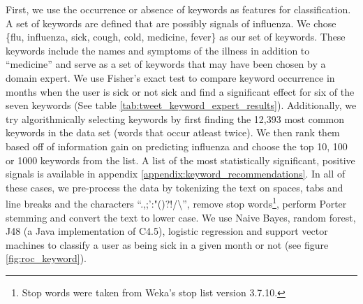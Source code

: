 First, we use the occurrence or absence of keywords as features for classification. A set of keywords are defined that are possibly signals of influenza. We chose \{flu, influenza, sick, cough, cold, medicine, fever\} as our set of keywords. These keywords include the names and symptoms of the illness in addition to ``medicine'' and serve as a set of keywords that may have been chosen by a domain expert. We use Fisher's exact test to compare keyword occurrence in months when the user is sick or not sick and find a significant effect for six of the seven keywords (See table \ref{tab:tweet_keyword_expert_results}). Additionally, we try algorithmically selecting keywords by first finding the 12,393 most common keywords in the data set (words that occur atleast twice).  We then rank them based off of information gain on predicting influenza and choose the top 10, 100 or 1000 keywords from the list. A list of the most statistically significant, positive signals is available in appendix \ref{appendix:keyword_recommendations}. In all of these cases, we pre-process the data by tokenizing the text on spaces, tabs and line breaks and the characters ``.,;':"()?!/\textbackslash '', remove stop words\footnote{Stop words were taken from Weka's stop list version 3.7.10.}, perform Porter stemming \cite{Porter:1980dd}  and convert the text to lower case. We use Naive Bayes, random forest, J48 (a Java implementation of C4.5), logistic regression and support vector machines to classify a user as being sick in a given month or not (see figure \ref{fig:roc_keyword}).




